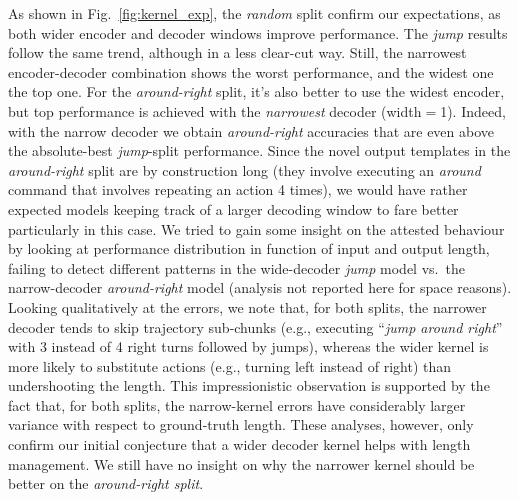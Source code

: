 As shown in Fig.~\ref{fig:kernel_exp}, the \emph{random} split confirm
our expectations, as both wider encoder and decoder windows improve
performance. The \emph{jump} results follow the same trend, although
in a less clear-cut way. Still, the narrowest encoder-decoder
combination shows the worst performance, and the widest one the top
one. For the \emph{around-right} split, it's also better to use the
widest encoder, but top performance is achieved with the
\emph{narrowest} decoder (width$=$1). Indeed, with the narrow decoder
we obtain \emph{around-right} accuracies that are even above the
absolute-best \emph{jump}-split performance. Since the novel output
templates in the \emph{around-right} split are by construction long
(they involve executing an \emph{around} command that involves
repeating an action 4 times), we would have rather expected models
keeping track of a larger decoding window to fare better particularly
in this case. We tried to gain some insight on the attested behaviour
by looking at performance distribution in function of input and output
length, failing to detect different patterns in the wide-decoder
\emph{jump} model vs.~the narrow-decoder \emph{around-right} model
(analysis not reported here for space reasons). Looking qualitatively
at the errors, we note that, for both splits, the narrower decoder
tends to skip trajectory sub-chunks (e.g., executing ``\emph{jump around
right}'' with 3 instead of 4 right turns followed by jumps), whereas
the wider kernel is more likely to substitute actions (e.g., turning
left instead of right) than undershooting the length. This
impressionistic observation is supported by the fact that, for both
splits, the narrow-kernel errors have considerably larger variance
with respect to ground-truth length. These analyses, however, only confirm our
initial conjecture that a wider decoder kernel helps with length management.
We still have no insight on why the narrower kernel should be better on
the \emph{around-right split}.%
